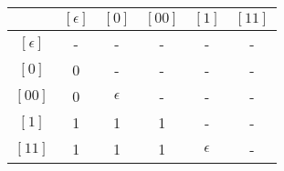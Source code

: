 \begin{center}
\begin{tabular}{|c|c|c|c|c|c|}
    \hline
    & \([\epsilon]\) & \([0]\) & \([00]\) & \([1]\) & \([11]\) \\
    \hline
    \([\epsilon]\) & - & - & - & - & - \\
    \hline
    \([0]\) & 0 & - & - & - & - \\
    \hline
    \([00]\) & 0 & \( \epsilon \) & - & - & - \\
    \hline
    \([1]\) & 1 & 1 & 1 & - & - \\
    \hline
    \([11]\) & 1 & 1 & 1 & \( \epsilon \) & - \\
    \hline
\end{tabular}
\end{center}


